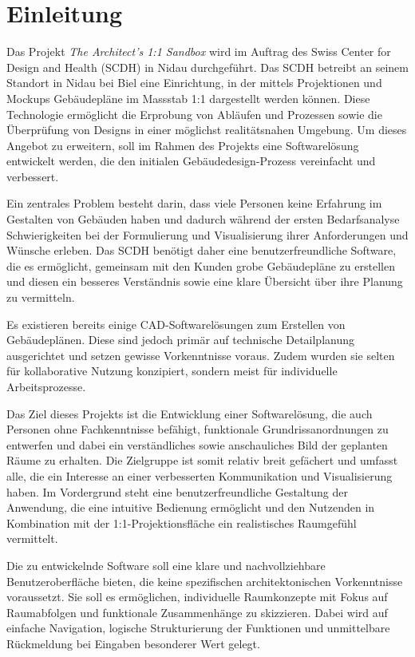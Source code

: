 \section{Einleitung}
\label{einleitung}

Das Projekt \textit{The Architect's 1:1 Sandbox} wird im Auftrag des Swiss Center for Design and Health (SCDH) in Nidau durchgeführt. Das SCDH betreibt an seinem Standort in Nidau bei Biel eine Einrichtung, in der mittels Projektionen und Mockups Gebäudepläne im Massstab 1:1 dargestellt werden können. Diese Technologie ermöglicht die Erprobung von Abläufen und Prozessen sowie die Überprüfung von Designs in einer möglichst realitätsnahen Umgebung. Um dieses Angebot zu erweitern, soll im Rahmen des Projekts eine Softwarelösung entwickelt werden, die den initialen Gebäudedesign-Prozess vereinfacht und verbessert.

Ein zentrales Problem besteht darin, dass viele Personen keine Erfahrung im Gestalten von Gebäuden haben und dadurch während der ersten Bedarfsanalyse Schwierigkeiten bei der Formulierung und Visualisierung ihrer Anforderungen und Wünsche erleben. Das SCDH benötigt daher eine benutzerfreundliche Software, die es ermöglicht, gemeinsam mit den Kunden grobe Gebäudepläne zu erstellen und diesen ein besseres Verständnis sowie eine klare Übersicht über ihre Planung zu vermitteln.

Es existieren bereits einige CAD-Softwarelösungen zum Erstellen von Gebäudeplänen. Diese sind jedoch primär auf technische Detailplanung ausgerichtet und setzen gewisse Vorkenntnisse voraus. Zudem wurden sie selten für kollaborative Nutzung konzipiert, sondern meist für individuelle Arbeitsprozesse.

Das Ziel dieses Projekts ist die Entwicklung einer Softwarelösung, die auch Personen ohne Fachkenntnisse befähigt, funktionale Grundrissanordnungen zu entwerfen und dabei ein verständliches sowie anschauliches Bild der geplanten Räume zu erhalten. Die Zielgruppe ist somit relativ breit gefächert und umfasst alle, die ein Interesse an einer verbesserten Kommunikation und Visualisierung haben. Im Vordergrund steht eine benutzerfreundliche Gestaltung der Anwendung, die eine intuitive Bedienung ermöglicht und den Nutzenden in Kombination mit der 1:1-Projektionsfläche ein realistisches Raumgefühl vermittelt.

Die zu entwickelnde Software soll eine klare und nachvollziehbare Benutzeroberfläche bieten, die keine spezifischen architektonischen Vorkenntnisse voraussetzt. Sie soll es ermöglichen, individuelle Raumkonzepte mit Fokus auf Raumabfolgen und funktionale Zusammenhänge zu skizzieren. Dabei wird auf einfache Navigation, logische Strukturierung der Funktionen und unmittelbare Rückmeldung bei Eingaben besonderer Wert gelegt.

